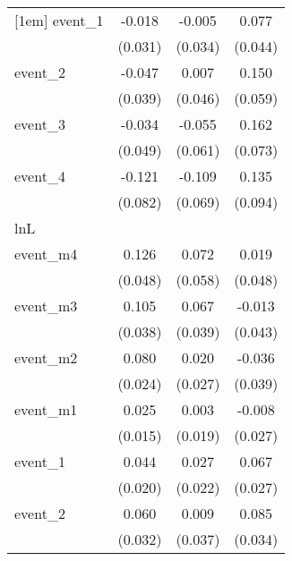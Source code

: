 {\begin{tabular}{l*{3}{c}}
[1em]
event\_1     &      -0.018         &      -0.005         &       0.077         \\
            &     (0.031)         &     (0.034)         &     (0.044)         \\
[1em]
event\_2     &      -0.047         &       0.007         &       0.150\sym{*}  \\
            &     (0.039)         &     (0.046)         &     (0.059)         \\
[1em]
event\_3     &      -0.034         &      -0.055         &       0.162\sym{*}  \\
            &     (0.049)         &     (0.061)         &     (0.073)         \\
[1em]
event\_4     &      -0.121         &      -0.109         &       0.135         \\
            &     (0.082)         &     (0.069)         &     (0.094)         \\
\hline
lnL         &                     &                     &                     \\
event\_m4    &       0.126\sym{**} &       0.072         &       0.019         \\
            &     (0.048)         &     (0.058)         &     (0.048)         \\
[1em]
event\_m3    &       0.105\sym{**} &       0.067         &      -0.013         \\
            &     (0.038)         &     (0.039)         &     (0.043)         \\
[1em]
event\_m2    &       0.080\sym{***}&       0.020         &      -0.036         \\
            &     (0.024)         &     (0.027)         &     (0.039)         \\
[1em]
event\_m1    &       0.025         &       0.003         &      -0.008         \\
            &     (0.015)         &     (0.019)         &     (0.027)         \\
[1em]
event\_1     &       0.044\sym{*}  &       0.027         &       0.067\sym{*}  \\
            &     (0.020)         &     (0.022)         &     (0.027)         \\
[1em]
event\_2     &       0.060         &       0.009         &       0.085\sym{*}  \\
            &     (0.032)         &     (0.037)         &     (0.034)         \\

\end{tabular}}
